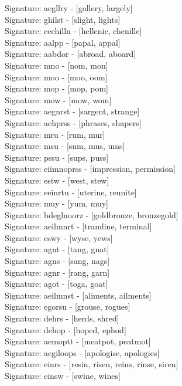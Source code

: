 Signature: {aegllry} - [gallery, largely] \\
Signature: {ghilst} - [slight, lights] \\
Signature: {ceehilln} - [hellenic, chenille] \\
Signature: {aalpp} - [papal, appal] \\
Signature: {aabdor} - [abroad, aboard] \\
Signature: {mno} - [nom, mon] \\
Signature: {moo} - [moo, oom] \\
Signature: {mop} - [mop, pom] \\
Signature: {mow} - [mow, wom] \\
Signature: {aegnrst} - [sargent, strange] \\
Signature: {aehprss} - [phrases, shapers] \\
Signature: {mru} - [rum, mur] \\
Signature: {msu} - [sum, mus, ums] \\
Signature: {pssu} - [sups, puss] \\
Signature: {eiimnoprss} - [impression, permission] \\
Signature: {estw} - [west, stew] \\
Signature: {eeinrtu} - [uterine, reunite] \\
Signature: {muy} - [yum, muy] \\
Signature: {bdeglnoorz} - [goldbronze, bronzegold] \\
Signature: {aeilmnrt} - [tramline, terminal] \\
Signature: {eswy} - [wyse, yews] \\
Signature: {agnt} - [tang, gnat] \\
Signature: {agns} - [sang, nags] \\
Signature: {agnr} - [rang, garn] \\
Signature: {agot} - [toga, goat] \\
Signature: {aeilmnst} - [aliments, ailments] \\
Signature: {egorsu} - [grouse, rogues] \\
Signature: {dehrs} - [herds, shred] \\
Signature: {dehop} - [hoped, ephod] \\
Signature: {aemoptt} - [meatpot, peatmot] \\
Signature: {aegiloops} - [apologise, apologies] \\
Signature: {einrs} - [resin, risen, reins, rinse, siren] \\
Signature: {einsw} - [swine, wines] \\
